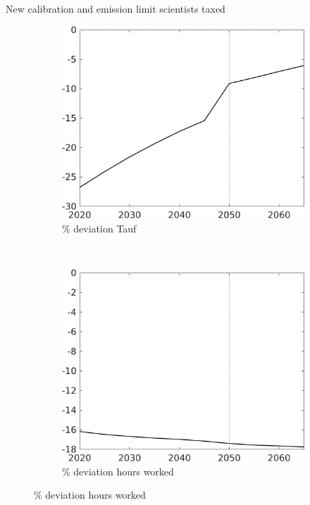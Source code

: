 \documentclass[11pt,aspectratio=169]{beamer}
\begin{document}
\begin{frame}{New calibration and emission limit scientists taxed}
\begin{figure}[h!!]
	\centering
	\begin{subfigure}{0.4\textwidth}		
		\caption{{\% deviation  Tauf}}
		\includegraphics[width=1\textwidth]{../codding_model/own_basedOnFried/optimalPol_010922_revision/figures/all_13Sept22/Tauf_COMPtaulPerNewCalib_T_regime4_emnet1_Sun2_spillover0_knspil3_noskill0_sep0_xgrowth0_PV1_etaa0.79.png}
	\end{subfigure}
	\begin{minipage}[]{0.1\textwidth}
		\
	\end{minipage}
	\begin{subfigure}{0.4\textwidth}		
		\caption{{\% deviation hours worked}}
	\includegraphics[width=1\textwidth]{../codding_model/own_basedOnFried/optimalPol_010922_revision/figures/all_13Sept22/Hagg_COMPtaulPerNewCalib_T_regime4_emnet1_Sun2_spillover0_knspil3_noskill0_sep0_xgrowth0_PV1_etaa0.79.png}

\end{subfigure}
\end{figure}
\end{frame}
\end{document}
